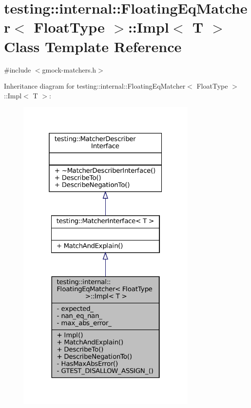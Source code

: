 \hypertarget{classtesting_1_1internal_1_1FloatingEqMatcher_1_1Impl}{}\section{testing\+:\+:internal\+:\+:Floating\+Eq\+Matcher$<$ Float\+Type $>$\+:\+:Impl$<$ T $>$ Class Template Reference}
\label{classtesting_1_1internal_1_1FloatingEqMatcher_1_1Impl}


{\ttfamily \#include $<$gmock-\/matchers.\+h$>$}



Inheritance diagram for testing\+:\+:internal\+:\+:Floating\+Eq\+Matcher$<$ Float\+Type $>$\+:\+:Impl$<$ T $>$\+:
\nopagebreak
\begin{figure}[H]
\begin{center}
\leavevmode
\includegraphics[width=253pt]{classtesting_1_1internal_1_1FloatingEqMatcher_1_1Impl__inherit__graph}
\end{center}
\end{figure}


